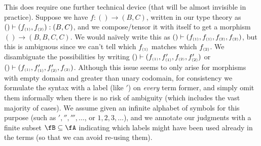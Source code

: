 \begin{props}
This does require one further technical device (that will be almost invisible in practice).
Suppose we have $f:()\to (B,C)$, written in our type theory as $()\vdash (f_{\scriptscriptstyle(1)},f_{\scriptscriptstyle(2)}):(B,C)$, and we compose/tensor it with itself to get a morphism $() \to (B,B,C,C)$.
We would na\"ively write this as $() \vdash (f_{\scriptscriptstyle(1)},f_{\scriptscriptstyle(1)},f_{\scriptscriptstyle(2)},f_{\scriptscriptstyle(2)})$, but this is ambiguous since we can't tell which $f_{\scriptscriptstyle(1)}$ matches which $f_{\scriptscriptstyle(2)}$.
We disambiguate the possibilities by writing $() \vdash (f_{\scriptscriptstyle(1)},f'_{\scriptscriptstyle(1)},f_{\scriptscriptstyle(2)},f'_{\scriptscriptstyle(2)})$ or $() \vdash (f_{\scriptscriptstyle(1)},f'_{\scriptscriptstyle(1)},f'_{\scriptscriptstyle(2)},f_{\scriptscriptstyle(2)})$.
Although this issue seems to only arise for morphisms with empty domain and greater than unary codomain, for consistency we formulate the syntax with a label (like $'$) on \emph{every} term former, and simply omit them informally when there is no risk of ambiguity (which includes the vast majority of cases).
We assume given an infinite alphabet of symbols \fA for this purpose (such as $','',''',\dots$, or $1,2,3,\dots$), and we annotate our judgments with a finite subset $\fB\subseteq \fA$ indicating which labels might have been used already in the terms (so that we can avoid re-using them).


\end{props}
